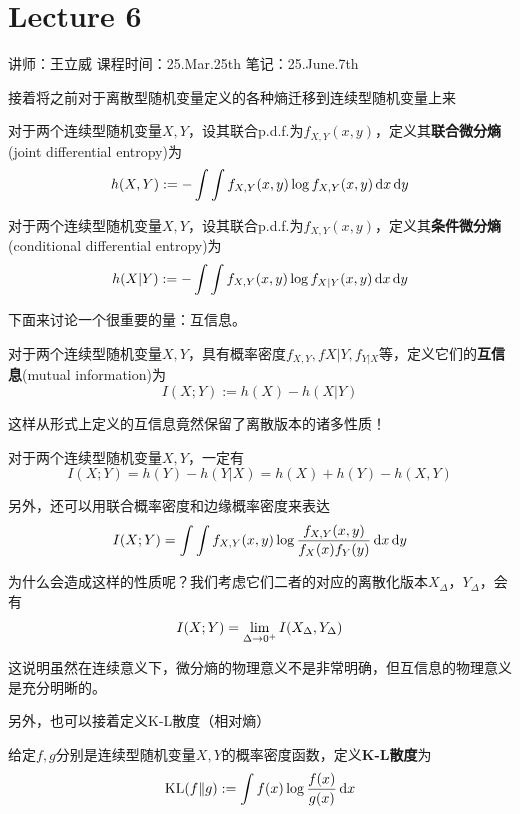 \chapter{Lecture 6}

\begin{center}
    讲师：王立威 \qquad
    课程时间：25.Mar.25th \qquad 
    笔记：25.June.7th
\end{center}

\bigskip

接着将之前对于离散型随机变量定义的各种熵迁移到连续型随机变量上来 
\begin{definition}[联合微分熵]
    对于两个连续型随机变量$X,Y$，设其联合p.d.f.为$f_{X,Y}(x,y)$，定义其\textbf{联合微分熵}(joint differential entropy)为 
    \[
    h(X, Y) := - \int\int f_{X,Y}(x, y) \log f_{X,Y}(x, y) \dx\dx[y]
    \]
\end{definition}
\begin{definition}[条件微分熵]
    对于两个连续型随机变量$X,Y$，设其联合p.d.f.为$f_{X,Y}(x,y)$，定义其\textbf{条件微分熵}(conditional differential entropy)为 
    \[
    h(X| Y) := - \int\int f_{X,Y}(x, y) \log f_{X|Y}(x, y) \dx\dx[y]
    \]
\end{definition}

下面来讨论一个很重要的量：互信息。 
\begin{definition}[连续型随机变量的互信息]
    对于两个连续型随机变量$X, Y$，具有概率密度$f_{X,Y}, f{X|Y}, f_{Y|X}$等，定义它们的\textbf{互信息}(mutual information)为 
    \[
    I(X; Y):= h(X) - h(X|Y)
    \]
\end{definition}

这样从形式上定义的互信息竟然保留了离散版本的诸多性质！
\begin{theorem}
    对于两个连续型随机变量$X, Y$，一定有
    \[
    I(X;Y) = h(Y) - h(Y|X) = h(X) + h(Y) - h(X, Y)
    \]

    另外，还可以用联合概率密度和边缘概率密度来表达
    \[
    I(X; Y) = \int\int f_{X,Y}(x, y) \log \dfrac{f_{X,Y}(x,y)}{f_X(x) f_Y(y)} \dx\dx[y]
    \]
\end{theorem}

为什么会造成这样的性质呢？我们考虑它们二者的对应的离散化版本$X_\Delta， Y_\Delta$，会有 
\[
I(X; Y) = \lim_{\Delta\ra 0^+} I(X_\Delta, Y_\Delta)
\]

这说明虽然在连续意义下，微分熵的物理意义不是非常明确，但互信息的物理意义是充分明晰的。

另外，也可以接着定义K-L散度（相对熵）
\begin{definition}
    给定$f,g$分别是连续型随机变量$X,Y$的概率密度函数，定义\textbf{K-L散度}为 
    \[
    \text{KL}(f\| g) := \int f(x) \log \dfrac{f(x)}{g(x)} \dx
    \]
\end{definition}

